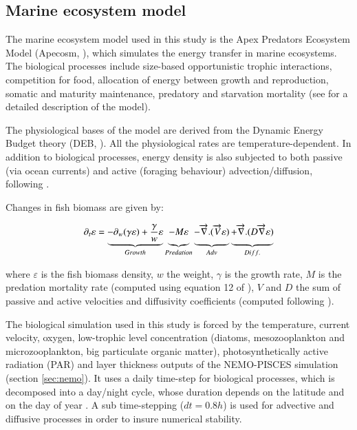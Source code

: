 \subsection{Marine ecosystem model}
\label{sec:apecosm}

The marine ecosystem model used in this study is the Apex Predators Ecosystem Model (Apecosm, \citealt{mauryModelingEnvironmentalEffects2007, mauryOverviewAPECOSMSpatialized2010}), which simulates the energy transfer in marine ecosystems. The biological processes include size-based opportunistic trophic interactions, competition for food, allocation of energy between growth and reproduction, somatic and maturity maintenance, predatory and starvation mortality (see \citealt{mauryModelingEnvironmentalEffects2007} for a detailed description of the model). 

The physiological bases of the model are derived from the Dynamic Energy Budget theory (DEB, \citealt{kooijmanDynamicEnergyMass2000}). All the physiological rates are temperature-dependent. In addition to biological processes, energy density is also subjected to both passive (via ocean currents) and active (foraging behaviour) advection/diffusion, following \cite{faugerasAdvectiondiffusionreactionSizestructuredFish2005}.

Changes in fish biomass are given by:

\begin{equation}
\partial_t \varepsilon = \underbrace{- \partial_w(\gamma \varepsilon) + \frac{\gamma}{w}\varepsilon}_{Growth} 
\underbrace{- M \varepsilon \vphantom{\frac{\gamma}{w}\varepsilon}}_{Predation}
\underbrace{-\overrightarrow{\nabla}.(\overrightarrow{V} \varepsilon) \vphantom{\frac{\gamma}{w}\varepsilon}}_{Adv} 
\underbrace{+ \overrightarrow{\nabla} . (D \overrightarrow{\nabla} \varepsilon) \vphantom{\frac{\gamma}{w}\varepsilon}}_{Diff.}
\label{eq:apecosm_trend}
\end{equation}

where $\varepsilon$  is the fish biomass density, $w$ the weight, $\gamma$ is the growth rate, $M$ is the predation mortality rate (computed using equation 12 of \citealt{mauryIndividualsPopulationsCommunities2013}), $V$ and $D$ the sum of passive and active velocities and diffusivity coefficients (computed following \citealt{faugerasAdvectiondiffusionreactionSizestructuredFish2005}).

The biological simulation used in this study is forced by the temperature, current velocity, oxygen, low-trophic level concentration (diatoms, mesozooplankton and microzooplankton, big particulate organic matter), photosynthetically active radiation (PAR) and layer thickness outputs of the NEMO-PISCES simulation (section \ref{sec:nemo}). It uses a daily time-step for biological processes, which is decomposed into a day/night cycle, whose duration depends on the latitude and on the day of year \citep{forsytheModelComparisonDaylength1995}. A sub time-stepping ($dt =0.8h$) is used for advective and diffusive processes in order to insure numerical stability.

